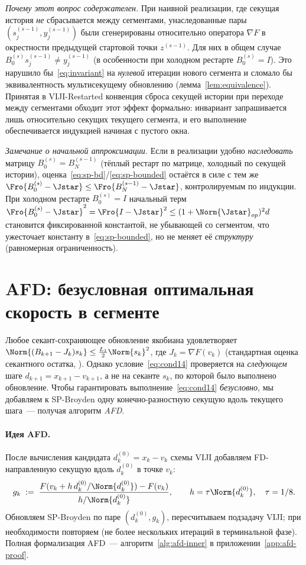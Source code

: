 \begin{remark}
\emph{Почему этот вопрос содержателен.} При наивной реализации, где
секущая история \emph{не} сбрасывается между сегментами, унаследованные
пары $(s_j^{(s-1)}, y_j^{(s-1)})$ были сгенерированы относительно
оператора $\nabla F$ в окрестности предыдущей стартовой точки
$z^{(s-1)}$. Для них в общем случае
$B_0^{(s)} s_j^{(s-1)} \ne y_j^{(s-1)}$ (в особенности при холодном
рестарте $B_0^{(s)} = I$). Это нарушило бы~\eqref{eq:invariant} на
\emph{нулевой} итерации нового сегмента и сломало бы эквивалентность
мультисекущему обновлению (лемма~\ref{lem:equivalence}). Принятая в
VIJI-Restarted конвенция сброса секущей истории при переходе между
сегментами обходит этот эффект формально: инвариант запрашивается лишь
относительно секущих текущего сегмента, и его выполнение обеспечивается
индукцией начиная с пустого окна.

\emph{Замечание о начальной аппроксимации.} Если в реализации удобно
\emph{наследовать} матрицу $B_0^{(s)} = B_{N}^{(s-1)}$ (тёплый рестарт по
матрице, холодный по секущей истории),
оценка~\eqref{eq:sp-bd}/\eqref{eq:sp-bounded} остаётся в силе с тем же
$\Fro{B_0^{(s)} - \Jstar} \le \Fro{B_{N}^{(s-1)} - \Jstar}$, контролируемым
по индукции. При холодном рестарте $B_0^{(s)} = I$ начальный
терм $\Fro{B_0^{(s)} - \Jstar}^2 = \Fro{I - \Jstar}^2 \le (1+\Norm{\Jstar}_{op})^2 d$
становится фиксированной константой, не убывающей со сегментом, что
ужесточает константу в~\eqref{eq:sp-bounded}, но не меняет её
\emph{структуру} (равномерная ограниченность).
\end{remark}

\section{AFD: безусловная оптимальная скорость в сегменте}
\label{sec:viji:afd}

Любое секант-сохраняющее обновление якобиана удовлетворяет
$\Norm{(B_{k+1} - J_k) s_k} \le \tfrac{L_1}{2}\Norm{s_k}^2$, где
$J_k = \nabla F(v_k)$ \textup{(}стандартная оценка секантного остатка,
\cite[Lemma~4.1.12]{dennis1996}\textup{)}. Однако
условие~\eqref{eq:cond14} проверяется на \emph{следующем} шаге
$d_{k+1} = x_{k+1} - v_{k+1}$, а не на секанте $s_k$, по которой было
выполнено обновление. Чтобы гарантировать выполнение~\eqref{eq:cond14}
\emph{безусловно}, мы добавляем к SP-Broyden одну конечно-разностную
секущую вдоль текущего шага~--- получая алгоритм \emph{AFD}.

\paragraph{Идея AFD.} После вычисления кандидата $d^{(0)}_{k} = x_k - v_k$
схемы VIJI добавляем FD-направленную секущую вдоль $d^{(0)}_k$ в точке $v_k$:
\[
g_k \;:=\; \frac{F(v_k + h\, d^{(0)}_k / \Norm{d^{(0)}_k}) - F(v_k)}{h/\Norm{d^{(0)}_k}},
\qquad h = \tau \Norm{d^{(0)}_k},\quad \tau = 1/8.
\]
Обновляем SP-Broyden по паре $(d^{(0)}_k, g_k)$, пересчитываем
подзадачу VIJI; при необходимости повторяем (не более нескольких
итераций в терминальной фазе). Полная формализация AFD~---
алгоритм~\ref{alg:afd-inner} в приложении~\ref{app:afd-proof}.

